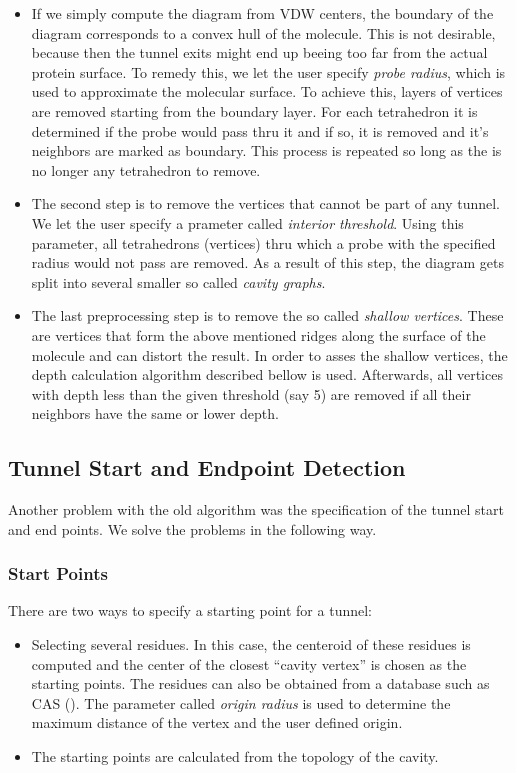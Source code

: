 \documentclass[11pt]{article} %
\begin{document}
\begin{itemize}
\item If we simply compute the diagram from VDW centers, the boundary of the diagram corresponds to a convex hull of the molecule.
This is not desirable, because then the tunnel exits might end up beeing too far from the actual protein surface. To remedy this, we let the user specify \textit{probe radius}, which is used to approximate the molecular surface. To achieve this, layers of vertices are removed starting from the boundary layer. For each tetrahedron it is determined if the probe would pass thru it and if so, it is removed and it's neighbors are marked as boundary. This process is repeated so long as the is no longer any tetrahedron to remove.
\item The second step is to remove the vertices that cannot be part of any tunnel. We let the user specify a prameter called \textit{interior threshold}. Using this parameter, all tetrahedrons (vertices) thru which a probe with the specified radius would not pass are removed. As a result of this step, the diagram gets split into several smaller so called \textit{cavity graphs}.
\item The last preprocessing step is to remove the so called \textit{shallow vertices}. These are vertices that form the above mentioned ridges along the surface of the molecule and can distort the result. In order to asses the shallow vertices, the depth calculation algorithm described bellow is used. Afterwards, all vertices with depth less than the given threshold (say 5) are removed if all their neighbors have the same or lower depth.
\end{itemize}

\subsection{Tunnel Start and Endpoint Detection}

Another problem with the old algorithm was the specification of the tunnel start and end points. We solve the problems in the following way.

\subsubsection{Start Points}
There are two ways to specify a starting point for a tunnel: 

\begin{itemize}
\item Selecting several residues. In this case, the centeroid of these residues is computed and the center of the closest ``cavity vertex'' is chosen as the starting points. The residues can also be obtained from a database such as CAS (\cite{CASDatabase}). The parameter called \textit{origin radius} is used to determine the maximum distance of the vertex and the user defined origin.
\item The starting points are calculated from the topology of the cavity.
\end{itemize}
\end{document}
